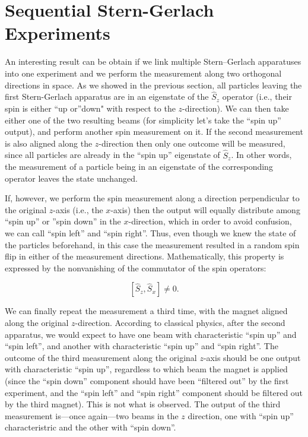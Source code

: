 \documentclass[
  9pt,
]{extbook}
\theoremstyle{definition}
\theoremstyle{definition}
\theoremstyle{definition}
\theoremstyle{remark}
\begin{document}
\hypertarget{sequential-stern-gerlach-experiments}{%
\section{Sequential Stern-Gerlach Experiments}\label{sequential-stern-gerlach-experiments}}

An interesting result can be obtain if we link multiple Stern--Gerlach apparatuses into one experiment and we perform the measurement along two orthogonal directions in space.
As we showed in the previous section, all particles leaving the first Stern-Gerlach apparatus are in an eigenstate of the \(\hat{S}_z\) operator (i.e., their spin is either ``up or''down" with respect to the \(z\)-direction). We can then take either one of the two resulting beams (for simplicity let's take the ``spin up'' output), and perform another spin measurement on it. If the second measurement is also aligned along the \(z\)-direction then only one outcome will be measured, since all particles are already in the ``spin up'' eigenstate of \(\hat{S}_z\). In other words, the measurement of a particle being in an eigenstate of the corresponding operator leaves the state unchanged.

If, however, we perform the spin measurement along a direction perpendicular to the original \(z\)-axis (i.e., the \(x\)-axis) then the output will equally distribute among ``spin up'' or ''spin down'' in the \(x\)-direction, which in order to avoid confusion, we can call ``spin left'' and ``spin right''. Thus, even though we knew the state of the particles beforehand, in this case the measurement resulted in a random spin flip in either of the measurement directions. Mathematically, this property is expressed by the nonvanishing of the commutator of the spin operators:

\begin{equation}
\left[\hat{S}_z,\hat{S}_x \right] \neq 0.
\label{eq:spin4}    
\end{equation}

We can finally repeat the measurement a third time, with the magnet aligned along the original \(z\)-direction. According to classical physics, after the second apparatus, we would expect to have one beam with characteristic ``spin up'' and ``spin left'', and another with characteristic ``spin up'' and ``spin right''. The outcome of the third measurement along the original \(z\)-axis should be one output with characteristic ``spin up'', regardless to which beam the magnet is applied (since the ``spin down'' component should have been ``filtered out'' by the first experiment, and the ``spin left'' and ``spin right'' component should be filtered out by the third magnet). This is not what is observed. The output of the third measurement is---once again---two beams in the \(z\) direction, one with ``spin up'' characteristric and the other with ``spin down''.
\end{document}
